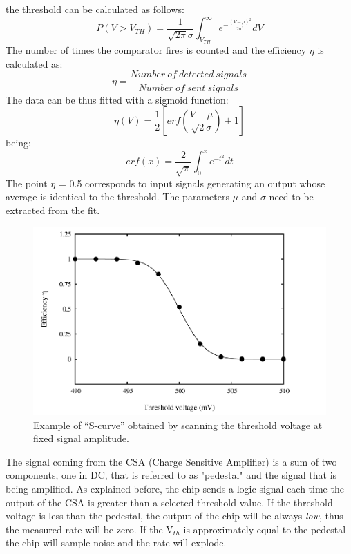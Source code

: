 the threshold can be calculated as follows:
\begin{equation}
	P(V>V_{TH}) = \frac{1}{\sqrt{2\pi}\sigma} \int_{V_{TH}}^{\infty} e^{- \frac{(V-\mu)^2}{2\sigma^2}} dV
\end{equation}
The number of times the comparator fires is counted and the efficiency $\eta$
is calculated as:
\begin{equation}
	\eta = \frac{Number \: of \: detected \: signals}{Number \: of \: sent \: signals}
\end{equation}
The data can be thus fitted with a sigmoid function:
\begin{equation}\label{erf}
	\eta (V) = \frac{1}{2} [erf(\frac{V-\mu}{\sqrt{2}\sigma})+1]
\end{equation}
being:
\begin{equation}
	erf(x) = \frac{2}{\sqrt{\pi}} \int_{0}^{x} e^{-t^2} dt
\end{equation}
The point $\eta$ = 0.5 corresponds to input signals generating an output whose average is identical to the threshold. The parameters $\mu$ and $\sigma$ need to be extracted from the fit.
\begin{figure}[H]
	\centering
	\includegraphics[width=0.65\linewidth]{IMG/ch5/THexample}
	\caption{Example of “S-curve” obtained by scanning the threshold voltage at fixed signal amplitude.}
	\label{fig:thexample}
\end{figure}
\noindent The signal coming from the CSA (Charge Sensitive Amplifier) is a sum of two components, one in DC, that is referred to as "pedestal" and the signal that is being amplified.
As explained before, the chip sends a logic signal each time the output of the CSA is greater than a selected threshold value.
If the threshold voltage is less than the pedestal, the output of the chip will be always \textit{low}, thus the measured rate will be zero.
If the V$_{th}$ is approximately equal to the pedestal the chip will sample noise and the rate will explode.
